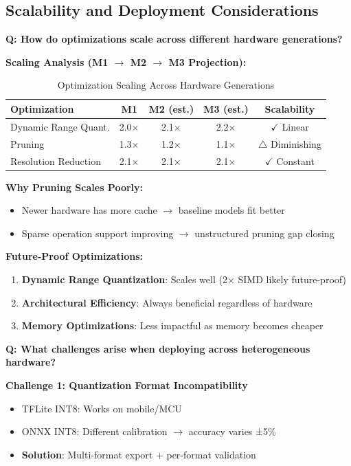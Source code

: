\documentclass[10pt, a4paper]{article}
\begin{document}
\subsection{Scalability and Deployment Considerations}

\textbf{Q: How do optimizations scale across different hardware generations?}

\textbf{Scaling Analysis (M1 $\rightarrow$ M2 $\rightarrow$ M3 Projection):}

\begin{table}[H]
\centering
\footnotesize
\begin{tabular}{|l|c|c|c|c|}
\hline
\textbf{Optimization} & \textbf{M1} & \textbf{M2 (est.)} & \textbf{M3 (est.)} & \textbf{Scalability} \\
\hline
Dynamic Range Quant. & 2.0$\times$ & 2.1$\times$ & 2.2$\times$ & $\checkmark$ Linear \\
Pruning & 1.3$\times$ & 1.2$\times$ & 1.1$\times$ & $\triangle$ Diminishing \\
Resolution Reduction & 2.1$\times$ & 2.1$\times$ & 2.1$\times$ & $\checkmark$ Constant \\
\hline
\end{tabular}
\caption{Optimization Scaling Across Hardware Generations}
\end{table}

\textbf{Why Pruning Scales Poorly:}
\begin{itemize}
    \item Newer hardware has more cache $\rightarrow$ baseline models fit better
    \item Sparse operation support improving $\rightarrow$ unstructured pruning gap closing
\end{itemize}

\textbf{Future-Proof Optimizations:}
\begin{enumerate}
    \item \textbf{Dynamic Range Quantization}: Scales well (2× SIMD likely future-proof)
    \item \textbf{Architectural Efficiency}: Always beneficial regardless of hardware
    \item \textbf{Memory Optimizations}: Less impactful as memory becomes cheaper
\end{enumerate}

\textbf{Q: What challenges arise when deploying across heterogeneous hardware?}

\textbf{Challenge 1: Quantization Format Incompatibility}
\begin{itemize}
    \item TFLite INT8: Works on mobile/MCU
    \item ONNX INT8: Different calibration $\rightarrow$ accuracy varies ±5\%
    \item \textbf{Solution}: Multi-format export + per-format validation
\end{itemize}
\end{document}
